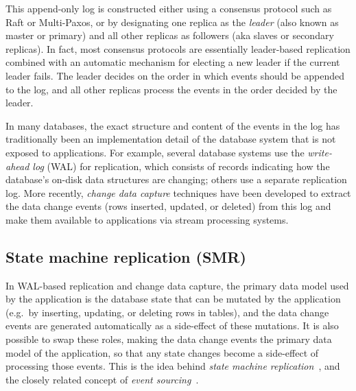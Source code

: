 \documentclass[sigconf,nonacm]{acmart}
\begin{document}
This append-only log is constructed either using a consensus protocol such as Raft or Multi-Paxos, or by designating one replica as the \emph{leader} (also known as master or primary) and all other replicas as followers (aka slaves or secondary replicas).
In fact, most consensus protocols are essentially leader-based replication combined with an automatic mechanism for electing a new leader if the current leader fails.
The leader decides on the order in which events should be appended to the log, and all other replicas process the events in the order decided by the leader.

In many databases, the exact structure and content of the events in the log has traditionally been an implementation detail of the database system that is not exposed to applications.
For example, several database systems use the \emph{write-ahead log} (WAL) for replication, which consists of records indicating how the database's on-disk data structures are changing; others use a separate replication log.
More recently, \emph{change data capture} techniques have been developed to extract the data change events (rows inserted, updated, or deleted) from this log and make them available to applications via stream processing systems.

\subsection{State machine replication (SMR)}\label{sec:smr}

In WAL-based replication and change data capture, the primary data model used by the application is the database state that can be mutated by the application (e.g.\ by inserting, updating, or deleting rows in tables), and the data change events are generated automatically as a side-effect of these mutations.
It is also possible to swap these roles, making the data change events the primary data model of the application, so that any state changes become a side-effect of processing those events.
This is the idea behind \emph{state machine replication}~\cite{Schneider:1990}, and the closely related concept of \emph{event sourcing}~\cite{Fowler:2005}.
\end{document}
